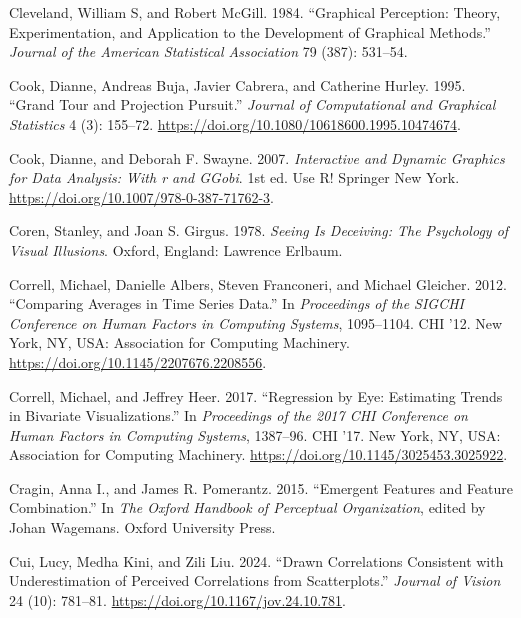 \documentclass[
  letterpaper,
  DIV=11,
  numbers=noendperiod]{scrreprt}
\newlength{\cslhangindent}
\newenvironment{CSLReferences}[2] %
 {\begin{list}{}{%
  \setlength{\itemindent}{0pt}
  \setlength{\leftmargin}{0pt}
  \setlength{\parsep}{0pt}
  \ifodd #1
   \setlength{\leftmargin}{\cslhangindent}
   \setlength{\itemindent}{-1\cslhangindent}
  \fi
  \setlength{\itemsep}{#2\baselineskip}}}
 {\end{list}}
\begin{document}
\begin{CSLReferences}{1}{0}
Cleveland, William S, and Robert McGill. 1984. {``Graphical Perception:
Theory, Experimentation, and Application to the Development of Graphical
Methods.''} \emph{Journal of the American Statistical Association} 79
(387): 531--54.

Cook, Dianne, Andreas Buja, Javier Cabrera, and Catherine Hurley. 1995.
{``Grand Tour and Projection Pursuit.''} \emph{Journal of Computational
and Graphical Statistics} 4 (3): 155--72.
\url{https://doi.org/10.1080/10618600.1995.10474674}.

Cook, Dianne, and Deborah F. Swayne. 2007. \emph{Interactive and Dynamic
Graphics for Data Analysis: With r and GGobi}. 1st ed. Use {R}! Springer
New York. \url{https://doi.org/10.1007/978-0-387-71762-3}.

Coren, Stanley, and Joan S. Girgus. 1978. \emph{Seeing Is Deceiving: The
Psychology of Visual Illusions}. Oxford, England: Lawrence Erlbaum.

Correll, Michael, Danielle Albers, Steven Franconeri, and Michael
Gleicher. 2012. {``Comparing Averages in Time Series Data.''} In
\emph{Proceedings of the SIGCHI Conference on Human Factors in Computing
Systems}, 1095--1104. CHI '12. New York, NY, USA: Association for
Computing Machinery. \url{https://doi.org/10.1145/2207676.2208556}.

Correll, Michael, and Jeffrey Heer. 2017. {``Regression by Eye:
Estimating Trends in Bivariate Visualizations.''} In \emph{Proceedings
of the 2017 CHI Conference on Human Factors in Computing Systems},
1387--96. CHI '17. New York, NY, USA: Association for Computing
Machinery. \url{https://doi.org/10.1145/3025453.3025922}.

Cragin, Anna I., and James R. Pomerantz. 2015. {``Emergent Features and
Feature Combination.''} In \emph{The Oxford Handbook of Perceptual
Organization}, edited by Johan Wagemans. Oxford University Press.

Cui, Lucy, Medha Kini, and Zili Liu. 2024. {``Drawn Correlations
Consistent with Underestimation of Perceived Correlations from
Scatterplots.''} \emph{Journal of Vision} 24 (10): 781--81.
\url{https://doi.org/10.1167/jov.24.10.781}.


\end{CSLReferences}
\end{document}
